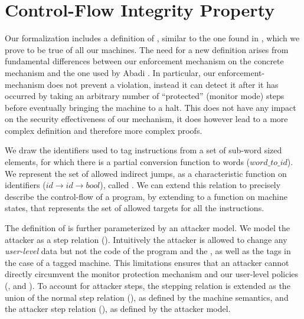 
\section{Control-Flow Integrity Property}\label{sec:cfi_property}

Our formalization includes a definition of \CFI, similar to the one found in
\cite{AbadiBEL09}, which we prove to be true of all our machines. The need for a
new definition arises from fundamental differences between our enforcement
mechanism on the concrete mechanism and the one used by Abadi \ETAL. In
particular, our enforcement-mechanism does not prevent a violation, instead
it can detect it after it has occurred by taking an arbitrary number of
``protected'' (monitor mode) steps before eventually bringing the machine to a
halt. This does not have any impact on the security effectiveness of our
mechanism, it does however lead to a more complex definition and therefore
more complex proofs.

We draw the identifiers used to tag instructions from a set of
sub-word sized elements, for which there is a partial conversion
function to words ($word\_to\_id$).
We represent the set of allowed indirect jumps, as a characteristic
function on identifiers ($id \rightarrow id \rightarrow bool$), called
\CFG. We can extend this relation to precisely describe the
control-flow of a program, by extending \CFG to a function \SUCC{} on
machine states, that represents the set of allowed targets for all the
instructions. 

The definition of \CFI is further parameterized by an attacker
model. We model the attacker as a step relation
(\stepa{}{}{}). Intuitively the attacker is allowed to change any
\emph{user-level} data but not the code of the program and the \pc, as
well as the tags in the case of a tagged machine.  This limitations
ensures that an attacker cannot directly circumvent the monitor
protection mechanism and our user-level policies (\NWC , \NXD and
\CFI). To account for attacker steps, the stepping relation is
extended as the union of the normal step relation (\stepn{}{}), as
defined by the machine semantics, and the attacker step relation
(\stepa{}{}{}), as defined by the attacker model.

